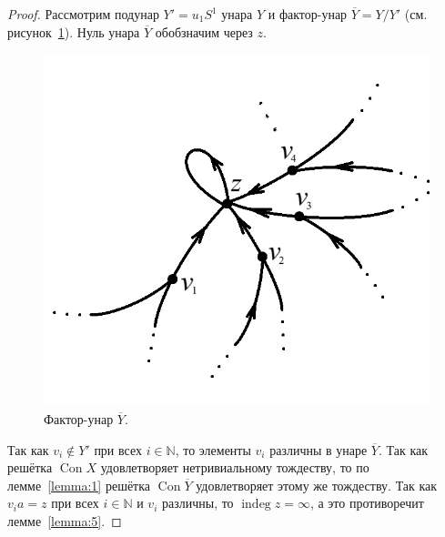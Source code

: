 \documentclass[11pt,twoside,final
]{article}
\def\Con{\operatorname{Con}}
\def\indeg{\operatorname{indeg}}
\begin{document}
\begin{proof}
	Рассмотрим подунар $Y' = u_1 S^1$ унара $Y$ и фактор-унар $\overline{Y} = Y/Y'$ (см. рисунок~\ref{fig:uzly_3}).
	Нуль унара $\overline{Y}$ обобзначим через $z$.
	\begin{figure}[ht!]
		\centering
		\includegraphics[scale=0.7]{img/uzly_3.png}
		\caption{Фактор-унар $\overline{Y}$.}
		\label{fig:uzly_3}
	\end{figure}
	Так как $v_i \notin Y'$ при всех $i \in \mathbb{N}$, то элементы $v_i$ различны в унаре $\overline{Y}$.
	Так как решётка $\Con X$ удовлетворяет нетривиальному тождеству, то по лемме~\ref{lemma:1} решётка $\Con \overline{Y}$ удовлетворяет этому же тождеству.
	Так как $v_i a = z$ при всех $i \in \mathbb{N}$ и $v_i$ различны, то $\indeg z = \infty$, а это противоречит лемме~\ref{lemma:5}.
	

\end{proof}
\end{document}
